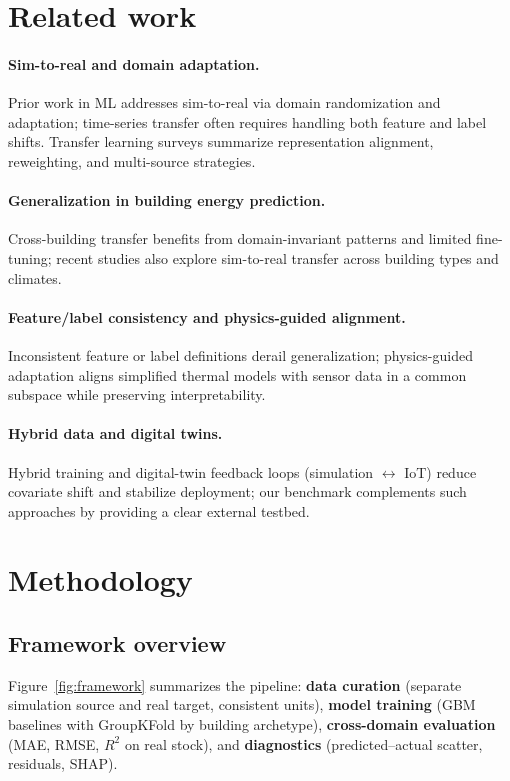 \documentclass{article}
\begin{document}
\section{Related work}
\paragraph{Sim-to-real and domain adaptation.}
Prior work in ML addresses sim-to-real via domain randomization and adaptation; time-series transfer often requires handling both feature and label shifts. Transfer learning surveys summarize representation alignment, reweighting, and multi-source strategies.

\paragraph{Generalization in building energy prediction.}
Cross-building transfer benefits from domain-invariant patterns and limited fine-tuning; recent studies also explore sim-to-real transfer across building types and climates.

\paragraph{Feature/label consistency and physics-guided alignment.}
Inconsistent feature or label definitions derail generalization; physics-guided adaptation aligns simplified thermal models with sensor data in a common subspace while preserving interpretability.

\paragraph{Hybrid data and digital twins.}
Hybrid training and digital-twin feedback loops (simulation $\leftrightarrow$ IoT) reduce covariate shift and stabilize deployment; our benchmark complements such approaches by providing a clear external testbed.

\section{Methodology}
\subsection{Framework overview}
Figure~\ref{fig:framework} summarizes the pipeline: \textbf{data curation} (separate simulation source and real target, consistent units), \textbf{model training} (GBM baselines with GroupKFold by building archetype), \textbf{cross-domain evaluation} (MAE, RMSE, $R^2$ on real stock), and \textbf{diagnostics} (predicted--actual scatter, residuals, SHAP).
\end{document}
